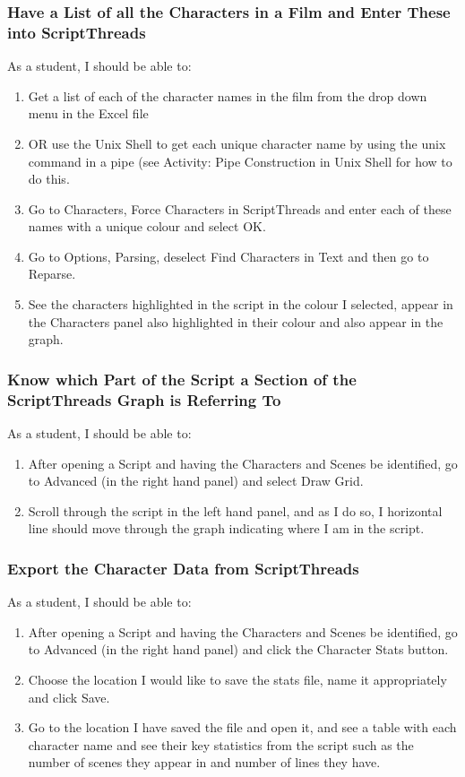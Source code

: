 \documentclass{article}
\begin{document}
\subsubsection{Have a List of all the Characters in a Film and Enter These into ScriptThreads}
As a student, I should be able to:
\begin{enumerate}
    \item Get a list of each of the character names in the film from the drop down menu in the Excel file
    \item OR use the Unix Shell to get each unique character name by using the unix command in a pipe (see Activity: Pipe Construction in Unix Shell for how to do this.
    \item Go to Characters, Force Characters in ScriptThreads and enter each of these names with a unique colour and select OK.
    \item Go to Options, Parsing, deselect Find Characters in Text and then go to Reparse.
    \item See the characters highlighted in the script in the colour I selected, appear in the Characters panel also highlighted in their colour and also appear in the graph.
\end{enumerate}

\subsubsection{Know which Part of the Script a Section of the ScriptThreads Graph is Referring To}
As a student, I should be able to:
\begin{enumerate}
    \item After opening a Script and having the Characters and Scenes be identified, go to Advanced (in the right hand panel) and select Draw Grid.
    \item Scroll through the script in the left hand panel, and as I do so, I horizontal line should move through the graph indicating where I am in the script.
\end{enumerate}

\subsubsection{Export the Character Data from ScriptThreads}
As a student, I should be able to:
\begin{enumerate}
    \item After opening a Script and having the Characters and Scenes be identified, go to Advanced (in the right hand panel) and click the Character Stats button.
    \item Choose the location I would like to save the stats file, name it appropriately and click Save.
    \item Go to the location I have saved the file and open it, and see a table with each character name and see their key statistics from the script such as the number of scenes they appear in and number of lines they have.
\end{enumerate}
\end{document}
